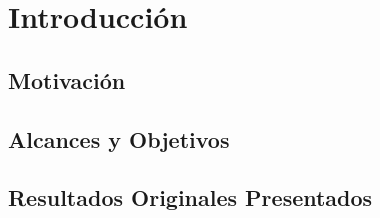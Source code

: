 \chapter{Introducción}
\section{Motivación}
\section{Alcances y Objetivos}
\section{Resultados Originales Presentados}

